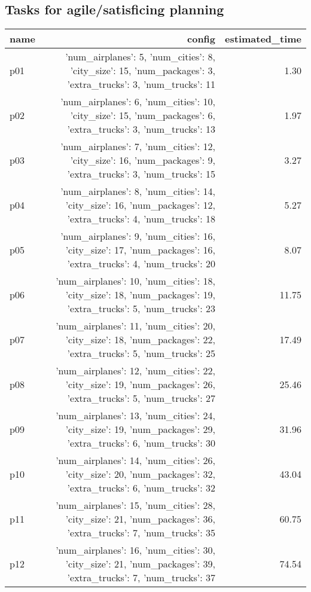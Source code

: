 \documentclass{article}
\begin{document}
                                \subsection*{Tasks for agile/satisficing planning}
                                
                            \begin{center}
                            \scriptsize
                            \begin{tabular}{@{}l|r|r@{}}
                            name & config & estimated\_time\\\midrule
                              p01&{'num\_airplanes': 5, 'num\_cities': 8, 'city\_size': 15, 'num\_packages': 3, 'extra\_trucks': 3, 'num\_trucks': 11}&1.30\\
  p02&{'num\_airplanes': 6, 'num\_cities': 10, 'city\_size': 15, 'num\_packages': 6, 'extra\_trucks': 3, 'num\_trucks': 13}&1.97\\
  p03&{'num\_airplanes': 7, 'num\_cities': 12, 'city\_size': 16, 'num\_packages': 9, 'extra\_trucks': 3, 'num\_trucks': 15}&3.27\\
  p04&{'num\_airplanes': 8, 'num\_cities': 14, 'city\_size': 16, 'num\_packages': 12, 'extra\_trucks': 4, 'num\_trucks': 18}&5.27\\
  p05&{'num\_airplanes': 9, 'num\_cities': 16, 'city\_size': 17, 'num\_packages': 16, 'extra\_trucks': 4, 'num\_trucks': 20}&8.07\\
  p06&{'num\_airplanes': 10, 'num\_cities': 18, 'city\_size': 18, 'num\_packages': 19, 'extra\_trucks': 5, 'num\_trucks': 23}&11.75\\
  p07&{'num\_airplanes': 11, 'num\_cities': 20, 'city\_size': 18, 'num\_packages': 22, 'extra\_trucks': 5, 'num\_trucks': 25}&17.49\\
  p08&{'num\_airplanes': 12, 'num\_cities': 22, 'city\_size': 19, 'num\_packages': 26, 'extra\_trucks': 5, 'num\_trucks': 27}&25.46\\
  p09&{'num\_airplanes': 13, 'num\_cities': 24, 'city\_size': 19, 'num\_packages': 29, 'extra\_trucks': 6, 'num\_trucks': 30}&31.96\\
  p10&{'num\_airplanes': 14, 'num\_cities': 26, 'city\_size': 20, 'num\_packages': 32, 'extra\_trucks': 6, 'num\_trucks': 32}&43.04\\
  p11&{'num\_airplanes': 15, 'num\_cities': 28, 'city\_size': 21, 'num\_packages': 36, 'extra\_trucks': 7, 'num\_trucks': 35}&60.75\\
  p12&{'num\_airplanes': 16, 'num\_cities': 30, 'city\_size': 21, 'num\_packages': 39, 'extra\_trucks': 7, 'num\_trucks': 37}&74.54\\

\end{tabular}
\end{center}
\end{document}
